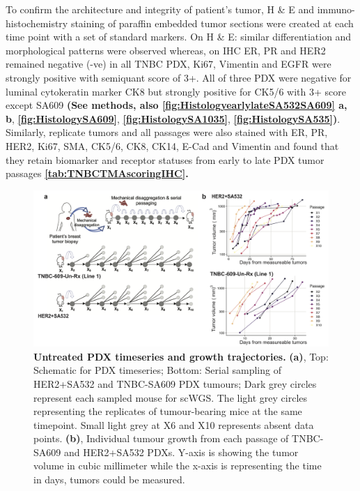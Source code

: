 To confirm the architecture and integrity of patient's tumor, H \& E and immuno-histochemistry staining of paraffin embedded tumor sections were created at each time point with a set of standard markers. On H \& E: similar differentiation and morphological patterns were observed whereas, on IHC ER, PR and HER2 remained negative (-ve) in all TNBC PDX, Ki67, Vimentin and EGFR were strongly positive with semiquant score of 3+. All of three PDX were negative for luminal cytokeratin marker CK8 but strongly positive for CK5/6 with 3+ score except SA609 \textbf{(See methods, also {\autoref{fig:HistologyearlylateSA532SA609}} a, b},  \textbf{\autoref{fig:HistologySA609}},  \textbf{\autoref{fig:HistologySA1035}}, \textbf{\autoref{fig:HistologySA535})}. 
Similarly, replicate tumors and all passages were also stained with ER, PR, HER2,
Ki67, SMA, CK5/6, CK8, CK14, E-Cad and Vimentin and found that they retain biomarker and receptor statuses from early to late PDX tumor passages \textbf{\autoref{tab:TNBCTMAscoringIHC}.}




 \begin{figure}
\centering
\includegraphics[width=\textwidth]{Figures/chap4/Untreatedgrowthcurves.png}
	
\caption[Untreated PDX timeseries and growth trajectories]
	{\small
	\textbf{Untreated PDX timeseries and growth trajectories.}
	    \textbf{(a)}, Top: Schematic for PDX timeseries; Bottom: Serial sampling of HER2+SA532 and TNBC-SA609 PDX tumours;
Dark grey circles represent each sampled mouse for scWGS. The light grey circles representing the replicates of tumour-bearing mice at the same timepoint. Small light grey at X6 and X10 represents absent data points.
	    \textbf{(b)}, Individual tumour growth from each passage of TNBC-SA609 and HER2+SA532 PDXs. Y-axis is showing the tumor volume in cubic millimeter while the x-axis is representing the time in days, tumors could be measured.}
	\label{fig:Untreatedgrowthcurves}
\end{figure}


